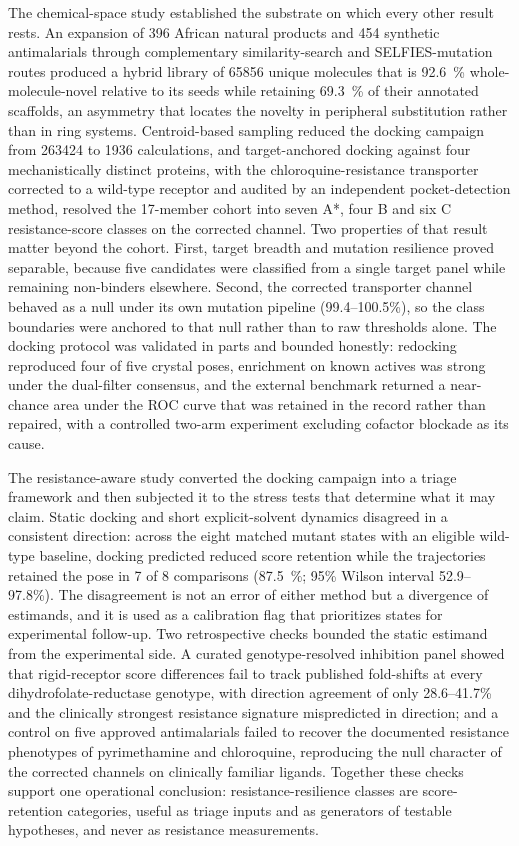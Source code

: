 The chemical-space study established the substrate on which every other result rests. An expansion of \num{396} African natural products and \num{454} synthetic antimalarials through complementary similarity-search and SELFIES-mutation routes produced a hybrid library of \num{65856} unique molecules that is \qty{92.6}{\percent} whole-molecule-novel relative to its seeds while retaining \qty{69.3}{\percent} of their annotated scaffolds, an asymmetry that locates the novelty in peripheral substitution rather than in ring systems. Centroid-based sampling reduced the docking campaign from \num{263424} to \num{1936} calculations, and target-anchored docking against four mechanistically distinct proteins, with the chloroquine-resistance transporter corrected to a wild-type receptor and audited by an independent pocket-detection method, resolved the \num{17}-member cohort into seven A*, four B and six C resistance-score classes on the corrected channel. Two properties of that result matter beyond the cohort. First, target breadth and mutation resilience proved separable, because five candidates were classified from a single target panel while remaining non-binders elsewhere. Second, the corrected transporter channel behaved as a null under its own mutation pipeline (\numrange{99.4}{100.5}\%), so the class boundaries were anchored to that null rather than to raw thresholds alone. The docking protocol was validated in parts and bounded honestly: redocking reproduced four of five crystal poses, enrichment on known actives was strong under the dual-filter consensus, and the external benchmark returned a near-chance area under the ROC curve that was retained in the record rather than repaired, with a controlled two-arm experiment excluding cofactor blockade as its cause.

The resistance-aware study converted the docking campaign into a triage framework and then subjected it to the stress tests that determine what it may claim. Static docking and short explicit-solvent dynamics disagreed in a consistent direction: across the eight matched mutant states with an eligible wild-type baseline, docking predicted reduced score retention while the trajectories retained the pose in \num{7} of \num{8} comparisons (\qty{87.5}{\percent}; 95\% Wilson interval \numrange{52.9}{97.8}\%). The disagreement is not an error of either method but a divergence of estimands, and it is used as a calibration flag that prioritizes states for experimental follow-up. Two retrospective checks bounded the static estimand from the experimental side. A curated genotype-resolved inhibition panel showed that rigid-receptor score differences fail to track published fold-shifts at every dihydrofolate-reductase genotype, with direction agreement of only \numrange{28.6}{41.7}\% and the clinically strongest resistance signature mispredicted in direction; and a control on five approved antimalarials failed to recover the documented resistance phenotypes of pyrimethamine and chloroquine, reproducing the null character of the corrected channels on clinically familiar ligands. Together these checks support one operational conclusion: resistance-resilience classes are score-retention categories, useful as triage inputs and as generators of testable hypotheses, and never as resistance measurements.

